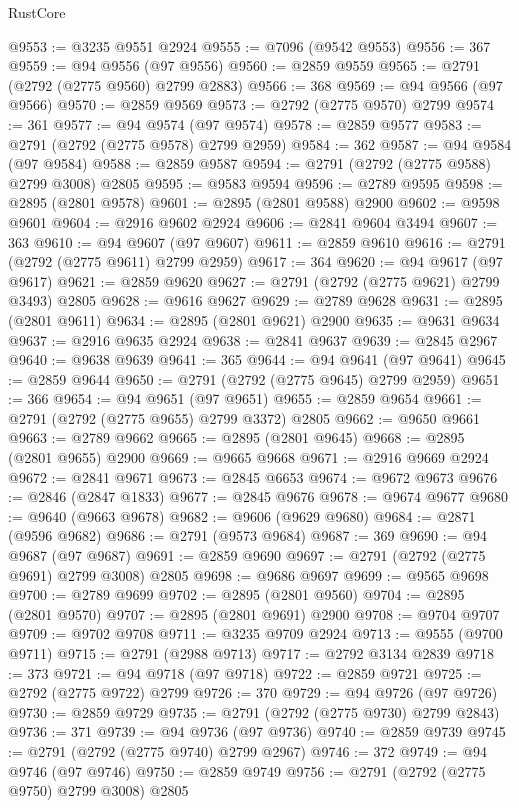 \begin{lexlean}{RustCore}
\begin{coremodule}
@9553 := @3235 @9551 @2924
@9555 := @7096 (@9542 @9553)
@9556 := 367
@9559 := @94 @9556 (@97 @9556)
@9560 := @2859 @9559
@9565 := @2791 (@2792 (@2775 @9560) @2799 @2883)
@9566 := 368
@9569 := @94 @9566 (@97 @9566)
@9570 := @2859 @9569
@9573 := @2792 (@2775 @9570) @2799
@9574 := 361
@9577 := @94 @9574 (@97 @9574)
@9578 := @2859 @9577
@9583 := @2791 (@2792 (@2775 @9578) @2799 @2959)
@9584 := 362
@9587 := @94 @9584 (@97 @9584)
@9588 := @2859 @9587
@9594 := @2791 (@2792 (@2775 @9588) @2799 @3008) @2805
@9595 := @9583 @9594
@9596 := @2789 @9595
@9598 := @2895 (@2801 @9578)
@9601 := @2895 (@2801 @9588) @2900
@9602 := @9598 @9601
@9604 := @2916 @9602 @2924
@9606 := @2841 @9604 @3494
@9607 := 363
@9610 := @94 @9607 (@97 @9607)
@9611 := @2859 @9610
@9616 := @2791 (@2792 (@2775 @9611) @2799 @2959)
@9617 := 364
@9620 := @94 @9617 (@97 @9617)
@9621 := @2859 @9620
@9627 := @2791 (@2792 (@2775 @9621) @2799 @3493) @2805
@9628 := @9616 @9627
@9629 := @2789 @9628
@9631 := @2895 (@2801 @9611)
@9634 := @2895 (@2801 @9621) @2900
@9635 := @9631 @9634
@9637 := @2916 @9635 @2924
@9638 := @2841 @9637
@9639 := @2845 @2967
@9640 := @9638 @9639
@9641 := 365
@9644 := @94 @9641 (@97 @9641)
@9645 := @2859 @9644
@9650 := @2791 (@2792 (@2775 @9645) @2799 @2959)
@9651 := 366
@9654 := @94 @9651 (@97 @9651)
@9655 := @2859 @9654
@9661 := @2791 (@2792 (@2775 @9655) @2799 @3372) @2805
@9662 := @9650 @9661
@9663 := @2789 @9662
@9665 := @2895 (@2801 @9645)
@9668 := @2895 (@2801 @9655) @2900
@9669 := @9665 @9668
@9671 := @2916 @9669 @2924
@9672 := @2841 @9671
@9673 := @2845 @6653
@9674 := @9672 @9673
@9676 := @2846 (@2847 @1833)
@9677 := @2845 @9676
@9678 := @9674 @9677
@9680 := @9640 (@9663 @9678)
@9682 := @9606 (@9629 @9680)
@9684 := @2871 (@9596 @9682)
@9686 := @2791 (@9573 @9684)
@9687 := 369
@9690 := @94 @9687 (@97 @9687)
@9691 := @2859 @9690
@9697 := @2791 (@2792 (@2775 @9691) @2799 @3008) @2805
@9698 := @9686 @9697
@9699 := @9565 @9698
@9700 := @2789 @9699
@9702 := @2895 (@2801 @9560)
@9704 := @2895 (@2801 @9570)
@9707 := @2895 (@2801 @9691) @2900
@9708 := @9704 @9707
@9709 := @9702 @9708
@9711 := @3235 @9709 @2924
@9713 := @9555 (@9700 @9711)
@9715 := @2791 (@2988 @9713)
@9717 := @2792 @3134 @2839
@9718 := 373
@9721 := @94 @9718 (@97 @9718)
@9722 := @2859 @9721
@9725 := @2792 (@2775 @9722) @2799
@9726 := 370
@9729 := @94 @9726 (@97 @9726)
@9730 := @2859 @9729
@9735 := @2791 (@2792 (@2775 @9730) @2799 @2843)
@9736 := 371
@9739 := @94 @9736 (@97 @9736)
@9740 := @2859 @9739
@9745 := @2791 (@2792 (@2775 @9740) @2799 @2967)
@9746 := 372
@9749 := @94 @9746 (@97 @9746)
@9750 := @2859 @9749
@9756 := @2791 (@2792 (@2775 @9750) @2799 @3008) @2805

\end{coremodule}
\end{lexlean}
